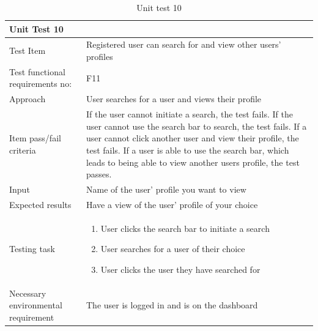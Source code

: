 \begin{table}[H]
\begin{tabular}{ | L{0.25\linewidth} | L{0.75\linewidth} | } 
 \hline {}
 Unit Test 10 &  \\
 \hline
 Test Item & Registered user can search for and view other users' profiles \\ 
 \hline
 Test functional requirements no: & F11
 \\ 
 \hline
 Approach & User searches for a user and views their profile\\
  \hline
 Item pass/fail criteria & If the user cannot initiate a search, the test fails. If the user cannot use the search bar to search, the test fails. If a user cannot click another user and view their profile, the test fails. If a user is able to use the search bar, which leads to being able to view another users profile, the test passes.\\
 \hline
 Input &  Name of the user' profile you want to view\\ 
 \hline
 Expected results & Have a view of the user' profile of your choice\\ 
  \hline
Testing task & 
    \vspace{-5mm}
    \begin{enumerate}[noitemsep]
  \item User clicks the search bar to initiate a search
  \item User searches for a user of their choice
  \item User clicks the user they have searched for
   \end{enumerate}\\
 \hline
 Necessary environmental requirement & The user is logged in and is on the dashboard\\ 
 \hline
\end{tabular}
\caption{Unit test 10}
\end{table}

